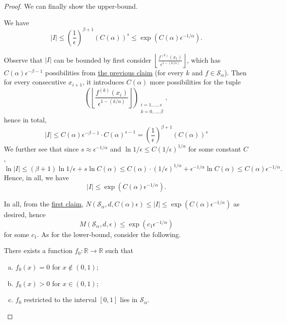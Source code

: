 \begin{proof}
	We can finally show the upper-bound.
	\begin{claim}\label{clm:metric-entropy-e}
		We have
		\[
			\vert I \vert \leq \left( \frac{1}{\epsilon } \right) ^{\beta + 1} (C(\alpha ))^s \leq \exp(C(\alpha ) \epsilon ^{-1 / \alpha }).
		\]
	\end{claim}
	\begin{explanation}
		Observe that \(\vert I \vert \) can be bounded by first consider \(\left\lfloor \frac{f^{(k)}(x_1)}{\epsilon ^{1 - (k / \alpha )}} \right\rfloor\), which has \(C(\alpha )\epsilon ^{-\beta -1}\) possibilities from \hyperref[clm:metric-entropy-b]{the previous claim} (for every \(k\) and \(f\in \mathcal{S} _\alpha \)). Then for every consecutive \(x_{i+1} \), it introduces \(C(\alpha )\) more possibilities for the tuple
		\[
			\left( \left\lfloor \frac{f^{(k)}(x_i)}{\epsilon ^{1 - (k / \alpha )}} \right\rfloor \right)_{\substack{i = 1, \dots , s \\ k = 0, \dots , \beta }}	,
		\]
		hence in total,
		\[
			\vert I \vert
			\leq C(\alpha ) \epsilon ^{- \beta - 1} \cdot C(\alpha )^{s-1}
			= \left( \frac{1}{\epsilon } \right) ^{\beta + 1} (C(\alpha ))^s
		\]
		We further see that since \(s \approx \epsilon ^{-1 / \alpha }\) and \(\ln 1 / \epsilon \leq C (1 / \epsilon )^{1 / \alpha }\) for some constant \(C\),
		\[
			\ln \vert I \vert
			\leq (\beta + 1) \ln 1 / \epsilon + s \ln C(\alpha )
			\leq C(\alpha ) \cdot (1 / \epsilon )^{1 / \alpha } + \epsilon ^{-1 / \alpha } \ln C(\alpha )
			\leq C(\alpha )\epsilon ^{-1 / \alpha }.
		\]
		Hence, in all, we have
		\[
			\vert I \vert \leq \exp \left( C(\alpha ) \epsilon ^{- 1 / \alpha } \right) .
		\]
	\end{explanation}
	In all, from the \hyperref[clm:metric-entropy-a]{first claim}, \(N(\mathcal{S} _\alpha , d, C(\alpha )\epsilon ) \leq \vert I \vert \leq \exp (C(\alpha )\epsilon ^{-1 / \alpha })\) as desired, hence
	\[
		M(\mathcal{S} _\alpha , d, \epsilon ) \leq \exp(c_1 \epsilon ^{-1 / \alpha })
	\]
	for some \(c_1\). As for the lower-bound, consider the following.
	\begin{claim}
		There exists a function \(f_0 \colon \mathbb{R} \to \mathbb{R} \) such that
		\begin{enumerate}[(a)]
			\item \(f_0(x) = 0 \) for \(x \notin (0, 1)\);
			\item \(f_0(x) > 0\) for \(x \in (0, 1)\);
			\item \(f_0\) restricted to the interval \([0, 1]\) lies in \(\mathcal{S} _\alpha \).

\end{enumerate}
\end{claim}
\end{proof}
